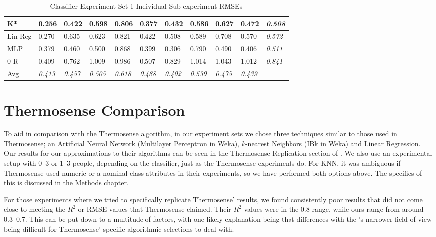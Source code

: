 \documentclass[../thesis/thesis.tex]{subfiles}
\begin{document}
\begin{landscape}
\begin{table}
\begin{tabular}{|l|l|l|l|l|l|l|l|l|l|l|}
K*      & 0.256          & 0.422          & 0.598          & 0.806          & 0.377          & 0.432          & 0.586          & 0.627          & 0.472          & \textit{0.508} \\ \hline
Lin Reg & 0.270          & 0.635          & 0.623          & 0.821          & 0.422          & 0.508          & 0.589          & 0.708          & 0.570          & \textit{0.572} \\ \hline
MLP     & 0.379          & 0.460          & 0.500          & 0.868          & 0.399          & 0.306          & 0.790          & 0.490          & 0.406          & \textit{0.511} \\ \hline
0-R     & 0.409          & 0.762          & 1.009          & 0.986          & 0.507          & 0.829          & 1.014          & 1.043          & 1.012          & \textit{0.841} \\ \hline
Avg     & \textit{0.413} & \textit{0.457} & \textit{0.505} & \textit{0.618} & \textit{0.488} & \textit{0.402} & \textit{0.539} & \textit{0.475} & \textit{0.439} &                \\ \hline
\end{tabular}
\caption{Classifier Experiment Set 1 Individual Sub-experiment RMSEs}
\label{tab:results:set1rmse}
\end{table}
\end{landscape}

\section{Thermosense Comparison}

To aid in comparison with the Thermosense algorithm, in our experiment sets we chose three techniques similar to those used in Thermosense; an Artificial Neural Network (Multilayer Perceptron in Weka), $k$-nearest Neighbors (IBk in Weka) and Linear Regression. Our results for our approximations to their algorithms can be seen in the Thermosense Replication section of . We also use an experimental setup with 0--3 or 1--3 people, depending on the classifier, just as the Thermosense experiments do. For KNN, it was ambiguous if Thermosense used numeric or a nominal class attributes in their experiments, so we have performed both options above. The specifics of this is discussed in the Methods chapter.

For those experiments where we tried to specifically replicate Thermosense' results, we found consistently poor results that did not come close to meeting the $R^2$ or RMSE values that Thermosense claimed. Their $R^2$ values were in the 0.8 range, while ours range from around 0.3--0.7. This can be put down to a multitude of factors, with one likely explanation being that differences with the \mlx's narrower field of view being difficult for Thermosense' specific algorithmic selections to deal with.
\end{document}
